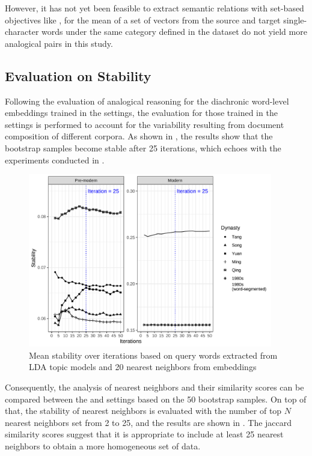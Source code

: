 However, it has not yet been feasible to extract semantic relations with set-based objectives like , for the mean of a set of vectors from the source and target single-character words under the same category defined in the dataset do not yield more analogical pairs in this study.

\subsection{Evaluation on Stability}
Following the evaluation of analogical reasoning for the diachronic word-level embeddings trained in the  settings, the evaluation for those trained in the  settings is performed to account for the variability resulting from document composition of different corpora. As shown in , the results show that the bootstrap samples become stable after 25 iterations, which echoes with the experiments conducted in \textcite{antoniak2018evaluating}.

\begin{figure}[H]
  \centering
  \includegraphics[width=0.95\textwidth,keepaspectratio]{figures_new/bootstrap_for_stability/stability.pdf}
  \caption{Mean stability over iterations based on query words extracted from LDA topic models and 20 nearest neighbors from  embeddings} \label{fig:stability_25}
\end{figure}

 Consequently, the analysis of nearest neighbors and their similarity scores can be compared between the  and  settings based on the 50 bootstrap samples. On top of that, the stability of nearest neighbors is evaluated with the number of top $N$ nearest neighbors set from 2 to 25, and the results are shown in . The jaccard similarity scores suggest that it is appropriate to include at least 25 nearest neighbors to obtain a more homogeneous set of data.

